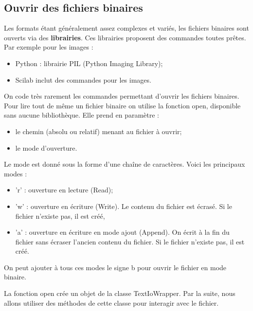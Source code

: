\documentclass[10pt,fleqn]{article} %
\begin{document}
\subsection{Ouvrir des fichiers binaires}
Les formats étant généralement assez complexes et variés, les fichiers binaires sont ouverts via des \textbf{librairies}. Ces librairies proposent des commandes toutes prêtes. Par exemple pour les images :
\begin{itemize}
\item Python : librairie PIL (Python Imaging Library);
\item Scilab inclut des commandes pour les images.
\end{itemize}

On code très rarement les commandes permettant d'ouvrir les fichiers binaires.
Pour lire tout de même un fichier binaire on utilise la fonction \textsf{open}, disponible sans aucune bibliothèque. Elle prend en paramètre :
\begin{itemize}
\item le chemin (absolu ou relatif) menant au fichier à ouvrir;
\item le mode d'ouverture.
\end{itemize}

Le mode est donné sous la forme d'une chaîne de caractères. Voici les principaux modes :
\begin{itemize}
\item 'r' : ouverture en lecture (Read);
\item 'w' : ouverture en écriture (Write). Le contenu du fichier est écrasé. Si le fichier n'existe pas, il est créé,
\item 'a' : ouverture en écriture en mode ajout (Append). On écrit à la fin du fichier sans écraser l'ancien contenu du fichier. Si le fichier n'existe pas, il est créé.
\end{itemize}

On peut ajouter à tous ces modes le signe b pour ouvrir le fichier en mode binaire.

La fonction open crée un objet de la classe \textsf{TextIoWrapper}. Par la suite, nous allons utiliser des méthodes de cette classe pour interagir avec le fichier.
\end{document}

